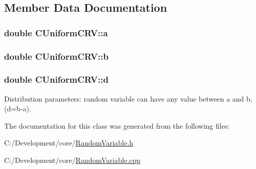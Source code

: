 \subsection{Member Data Documentation}
\hypertarget{class_c_uniform_c_r_v_abcc7651c5907899757ee7592f1b90dd5}{
\subsubsection[{a}]{\setlength{\rightskip}{0pt plus 5cm}double C\-Uniform\-C\-R\-V\-::a\hspace{0.3cm}{\ttfamily [private]}}}\label{class_c_uniform_c_r_v_abcc7651c5907899757ee7592f1b90dd5}
\hypertarget{class_c_uniform_c_r_v_a4c69f8949967ace20ce17ff7de02c3ce}{
\subsubsection[{b}]{\setlength{\rightskip}{0pt plus 5cm}double C\-Uniform\-C\-R\-V\-::b\hspace{0.3cm}{\ttfamily [private]}}}\label{class_c_uniform_c_r_v_a4c69f8949967ace20ce17ff7de02c3ce}
\hypertarget{class_c_uniform_c_r_v_adde06715632afa035ab41a9f090e0305}{
\subsubsection[{d}]{\setlength{\rightskip}{0pt plus 5cm}double C\-Uniform\-C\-R\-V\-::d\hspace{0.3cm}{\ttfamily [private]}}}\label{class_c_uniform_c_r_v_adde06715632afa035ab41a9f090e0305}
Distribution parameters\-: random variable can have any value between a and b, (d=b-\/a). 

The documentation for this class was generated from the following files\-:\begin{DoxyCompactItemize}
\item 
C\-:/\-Development/core/\hyperlink{_random_variable_8h}{Random\-Variable.\-h}\item 
C\-:/\-Development/core/\hyperlink{_random_variable_8cpp}{Random\-Variable.\-cpp}\end{DoxyCompactItemize}
